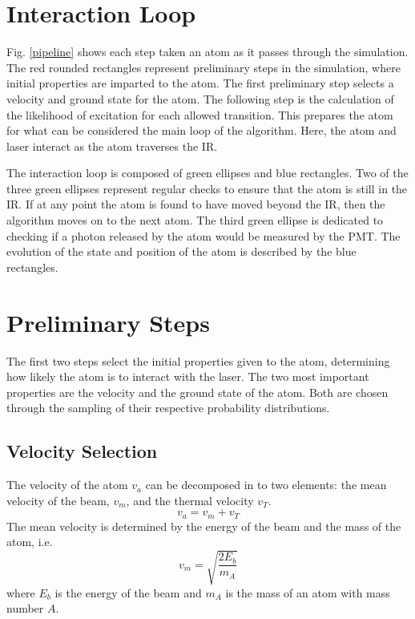 \label{pip}


\section{Interaction Loop}


Fig. \ref{pipeline} shows each step taken an atom as it passes through the simulation. The red rounded rectangles represent preliminary steps in the simulation, where initial properties are imparted to the atom. The first preliminary step selects a velocity and ground state for the atom. The following step is the calculation of the likelihood of excitation for each allowed transition. This prepares the atom for what can be considered the main loop of the algorithm. Here, the atom and laser interact as the atom traverses the IR. 

The interaction loop is composed of green ellipses and blue rectangles. Two of the three green ellipses represent regular checks to ensure that the atom is still in the IR. If at any point the atom is found to have moved beyond the IR, then the algorithm moves on to the next atom. The third green ellipse is dedicated to checking if a photon released by the atom would be measured by the PMT. The evolution of the state and position of the atom is described by the blue rectangles. 

\section{Preliminary Steps}
The first two steps select the initial properties given to the atom, determining how likely the atom is to interact with the laser. The two most important properties are the velocity and the ground state of the atom. Both are chosen through the sampling of their respective probability distributions.

\subsection{Velocity Selection}

The velocity of the atom $v_a$ can be decomposed in to two elements: the mean velocity of the beam, $v_{m}$, and the thermal velocity $v_{T}$. 
\begin{equation}
v_a = v_m + v_T
\end{equation}
The mean velocity is determined by the energy of the beam and the mass of the atom, i.e.
\begin{equation}
v_{m} = \sqrt{\frac{2E_b}{m_A}}
\end{equation}
where $E_b$ is the energy of the beam and $m_A$ is the mass of an atom with mass number $A$.

